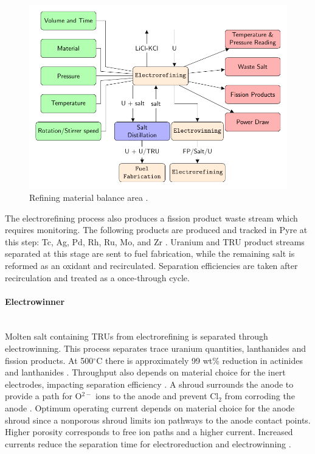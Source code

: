 \begin{figure}[h]
	\centering
	\includegraphics[width=0.85\linewidth]{images/refining}
	\caption{Refining material balance area \cite{lee_advanced_2008}.}
	\label{fig:refining}
\end{figure}

The electrorefining process also produces a fission product waste stream which requires monitoring. 
The following products are produced and tracked in Pyre at this step: Tc, Ag, Pd, Rh, Ru, Mo, and Zr \cite{flowsheet_1998}. 
Uranium and \gls{TRU} product streams separated at this stage are sent to fuel fabrication, while the remaining salt is reformed as an oxidant and recirculated.
Separation efficiencies are taken after recirculation and treated as a once-through cycle. 

\paragraph{Electrowinner} \mbox{}\\
Molten salt containing \glspl{TRU} from electrorefining is separated through electrowinning. This process separates trace uranium quantities, lanthanides and fission products. 
At 500$^{\circ}$C there is approximately 99 wt\% reduction in actinides and lanthanides \cite{flowsheet_1998}. 
Throughput also depends on material choice for the inert electrodes, impacting separation 
efficiency \cite{koyama_development_2012}. A shroud surrounds the anode to provide a path for O$^{2-}$ ions to the anode and 
prevent Cl$_2$ from corroding the anode \cite{kim_development_2013,choi_electrochemical_2015}. Optimum operating current 
depends on material choice for the anode shroud since a nonporous shroud limits ion pathways to the anode contact points.
Higher porosity corresponds to free ion paths and a higher current. Increased currents reduce the separation time for electroreduction and electrowinning \cite{choi_electrochemical_2015}.

